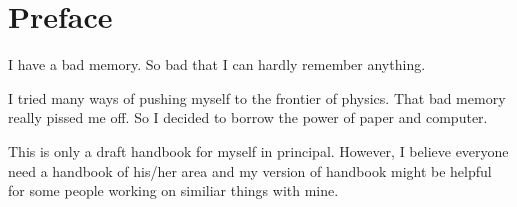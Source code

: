 \chapter{Preface}

I have a bad memory. So bad that I can hardly remember anything.

I tried many ways of pushing myself to the frontier of physics. That bad memory really pissed me off. So I decided to borrow the power of paper and computer.

This is only a draft handbook for myself in principal. However, I believe everyone need a handbook of his/her area and my version of handbook might be helpful for some people working on similiar things with mine.